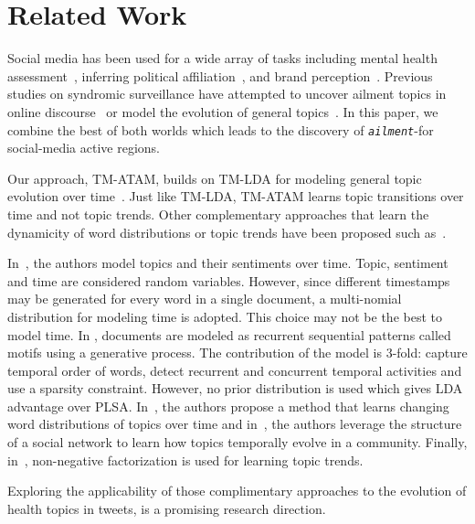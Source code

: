 \section{Related Work}
\label{sec:relwork}
Social media has been used for a wide array of tasks including mental health
assessment~\cite{twitter:anorexia,twitter:violence,twitter:mental}, 
inferring political affiliation~\cite{twitter:elec,twitter:elec2,twitter:elec3,twitter:elec4}, and 
brand perception~\cite{twitter:brand,twitter:brand2}.
Previous studies on syndromic surveillance have attempted to uncover ailment topics in online
discourse~\cite{DBLP:conf/nips/ChemuduguntaSS06,atam2} or model the
evolution of general topics~\cite{DBLP:conf/kdd/WangAB12}. In this
paper, we combine the best of both worlds which leads to the discovery
of \emph{\texttt{ailment}}-\seasons for social-media active regions. %

Our approach, TM-ATAM, builds on 
TM-LDA for modeling general topic evolution over
time~\cite{DBLP:conf/kdd/WangAB12}. Just like TM-LDA, TM-ATAM learns
topic transitions over time and not topic trends. Other complementary approaches that learn
the dynamicity of word distributions or topic trends have been
proposed such as~\cite{DBLP:conf/icml/BleiL06, DBLP:conf/icdm/LinMHJD11, DBLP:conf/kdd/WangM06}. %

In~\cite{DBLP:conf/icdm/DermoucheVKL14}, the authors model topics and their sentiments over time. Topic, sentiment and time are considered random variables. However, since different timestamps may be generated for every word in a single document, a multi-nomial distribution for modeling time is adopted. This choice may not be the best to model time. In \cite{DBLP:journals/ijcv/VaradarajanEO13}, documents are modeled as recurrent sequential patterns called motifs using a generative process. The contribution of the model is 3-fold: capture temporal order of words, detect recurrent and concurrent temporal activities and use a sparsity constraint. However, no prior distribution is used which gives LDA advantage over PLSA.
In~\cite{DBLP:conf/kdd/WangM06}, the authors propose a method
that learns changing word distributions of topics over time and
in~\cite{DBLP:conf/icdm/LinMHJD11}, the authors leverage the structure
of a social network to learn how topics temporally evolve in a
community. Finally, in~\cite{DBLP:conf/wsdm/SahaS12}, non-negative
factorization is used for learning topic trends. 

Exploring the
applicability of those complimentary approaches to the evolution of
health topics in tweets, is a promising research direction.
